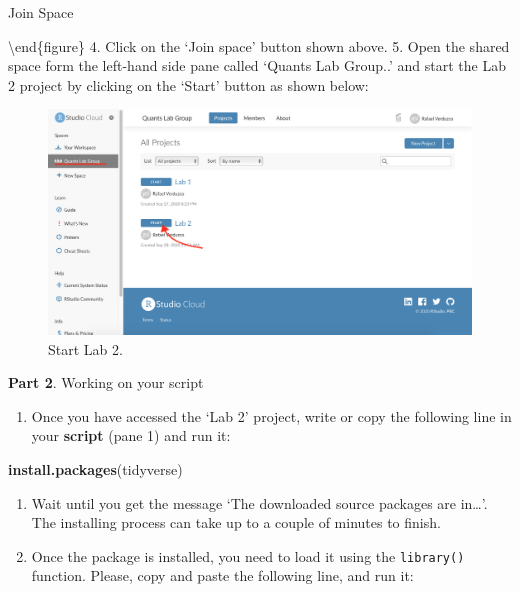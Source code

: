 \documentclass[
]{book}
\newenvironment{Shaded}{\begin{snugshade}}{\end{snugshade}}
\newcommand{\FunctionTok}[1]{\textcolor[rgb]{0.13,0.29,0.53}{\textbf{#1}}}
\newcommand{\NormalTok}[1]{#1}
\newcommand{\StringTok}[1]{\textcolor[rgb]{0.31,0.60,0.02}{#1}}
\providecommand{\tightlist}{%
  \setlength{\itemsep}{0pt}\setlength{\parskip}{0pt}}
\begin{document}
\caption{Join Space}

\label{fig:unnamed-chunk-14}
\textbackslash end\{figure\}
4. Click on the `Join space' button shown above.
5. Open the shared space form the left-hand side pane called `Quants Lab Group..' and start the Lab 2 project by clicking on the `Start' button as shown below:

\begin{figure}

\includegraphics[width=1\linewidth]{./images/rstudio_cloud_startproject_lab2} \hfill{}

\caption{Start Lab 2.}\label{fig:unnamed-chunk-15}
\end{figure}

\textbf{Part 2}. Working on your script

\begin{enumerate}
\def\labelenumi{\arabic{enumi}.}
\tightlist
\item
  Once you have accessed the `Lab 2' project, write or copy the following line in your \textbf{script} (pane 1) and run it:
\end{enumerate}

\begin{Shaded}
\begin{Highlighting}[]
\FunctionTok{install.packages}\NormalTok{(}\StringTok{\textquotesingle{}tidyverse\textquotesingle{}}\NormalTok{)}
\end{Highlighting}
\end{Shaded}

\begin{enumerate}
\def\labelenumi{\arabic{enumi}.}
\setcounter{enumi}{1}
\tightlist
\item
  Wait until you get the message `The downloaded source packages are in\ldots{}'. The installing process can take up to a couple of minutes to finish.
\item
  Once the package is installed, you need to load it using the \texttt{library()} function. Please, copy and paste the following line, and run it:
\end{enumerate}
\end{document}
